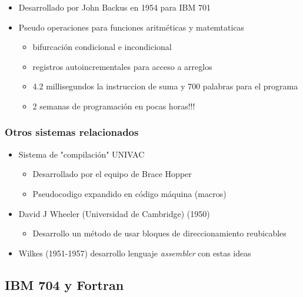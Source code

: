 \documentclass[11pt]{article}
\begin{document}
\begin{itemize}
\item Desarrollado por John Backus en 1954 para IBM 701
\item Pseudo operaciones para funciones aritméticas y matemtaticas
\begin{itemize}
\item bifurcación condicional e incondicional
\item registros autoincrementales para acceso a arreglos
\item 4.2 millisegundos la instruccion de suma y 700 palabras para el programa
\item 2 semanas de programación en pocas horas!!!
\end{itemize}
\end{itemize}

\subsubsection*{Otros sistemas relacionados}
\label{sec:orgheadline37}

\begin{itemize}
\item Sistema de "compilación" UNIVAC
\begin{itemize}
\item Desarrollado por el equipo de Brace Hopper
\item Pseudocodigo expandido en código máquina (macros)
\end{itemize}
\item David J Wheeler (Universidad de Cambridge) (1950)
\begin{itemize}
\item Desarrollo un método de usar bloques de direccionamiento reubicables
\end{itemize}
\item Wilkes (1951-1957) desarrollo lenguaje \emph{assembler} con estas ideas
\end{itemize}


\subsection*{IBM 704 y Fortran}
\label{sec:orgheadline48}
\end{document}
